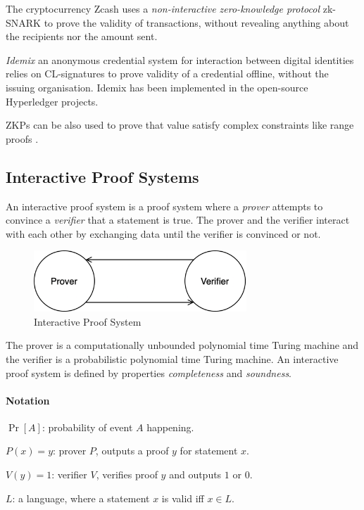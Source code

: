 The cryptocurrency Zcash uses a \textit{non-interactive zero-knowledge protocol} zk-SNARK \cite{bowe2018multi} to prove the validity of transactions, without revealing anything about the recipients nor the amount sent.

\textit{Idemix} \cite{camenisch2002design} an anonymous credential system for interaction between digital identities relies on CL-signatures \cite{camenisch2001efficient} to prove validity of a credential offline, without the issuing organisation.
Idemix has been implemented in the open-source Hyperledger projects.

ZKPs can be also used to prove that value satisfy complex constraints like range proofs \cite{camenisch2008efficient}.

\newpage
\subsection{Interactive Proof Systems}
\label{section:interactive-proof-systems}
An interactive proof system is a proof system where a \textit{prover} attempts to convince a \textit{verifier} that a statement is true.
The prover and the verifier interact with each other by exchanging data until the verifier is convinced or not.

\begin{figure}[h]
	\centering
	\includegraphics[width=8cm]{images/interactive-proof-system}
	\caption{Interactive Proof System}
	\label{fig:interactive-proof-system}
\end{figure}

The prover is a computationally unbounded polynomial time Turing machine and the verifier is a probabilistic polynomial time Turing machine.
An interactive proof system is defined by properties \textit{completeness} and \textit{soundness}.

\paragraph{Notation}
\begin{description}
	\item $\Pr[A]$: probability of event $A$ happening.
	\item $P(x) = y$: prover $P$, outputs a proof $y$ for statement $x$.
	\item $V(y) = 1$: verifier $V$, verifies proof $y$ and outputs $1$ or $0$.
	\item $L$: a language, where a statement $x$ is valid iff $x \in L$.
\end{description}

